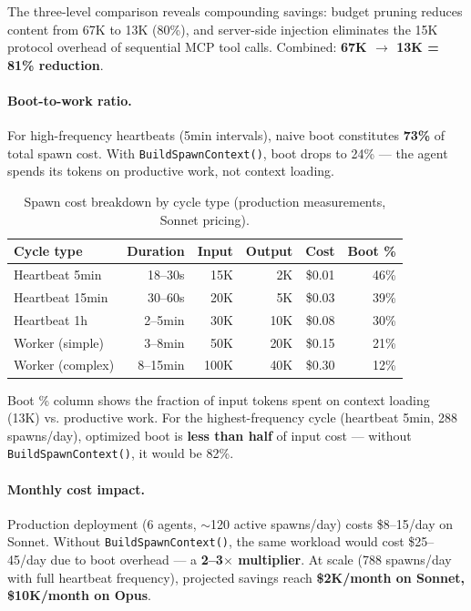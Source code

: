 \documentclass{article}
\begin{document}
The three-level comparison reveals compounding savings: budget pruning reduces content from 67K to 13K (80\%), and server-side injection eliminates the 15K protocol overhead of sequential MCP tool calls. Combined: \textbf{67K $\to$ 13K = 81\% reduction}.

\paragraph{Boot-to-work ratio.} For high-frequency heartbeats (5min intervals), naive boot constitutes \textbf{73\%} of total spawn cost. With \texttt{BuildSpawnContext()}, boot drops to 24\% --- the agent spends its tokens on productive work, not context loading.

\begin{table}[h]
\centering
\caption{Spawn cost breakdown by cycle type (production measurements, Sonnet pricing).}
\begin{tabular}{@{}lrrrrr@{}}
\toprule
\textbf{Cycle type} & \textbf{Duration} & \textbf{Input} & \textbf{Output} & \textbf{Cost} & \textbf{Boot \%} \\
\midrule
Heartbeat 5min & 18--30s & 15K & 2K & \$0.01 & 46\% \\
Heartbeat 15min & 30--60s & 20K & 5K & \$0.03 & 39\% \\
Heartbeat 1h & 2--5min & 30K & 10K & \$0.08 & 30\% \\
Worker (simple) & 3--8min & 50K & 20K & \$0.15 & 21\% \\
Worker (complex) & 8--15min & 100K & 40K & \$0.30 & 12\% \\
\bottomrule
\end{tabular}
\end{table}

Boot \% column shows the fraction of input tokens spent on context loading (13K) vs. productive work. For the highest-frequency cycle (heartbeat 5min, 288 spawns/day), optimized boot is \textbf{less than half} of input cost --- without \texttt{BuildSpawnContext()}, it would be 82\%.

\paragraph{Monthly cost impact.} Production deployment (6 agents, $\sim$120 active spawns/day) costs \$8--15/day on Sonnet. Without \texttt{BuildSpawnContext()}, the same workload would cost \$25--45/day due to boot overhead --- a \textbf{2--3$\times$ multiplier}. At scale (788 spawns/day with full heartbeat frequency), projected savings reach \textbf{\$2K/month on Sonnet, \$10K/month on Opus}.
\end{document}
